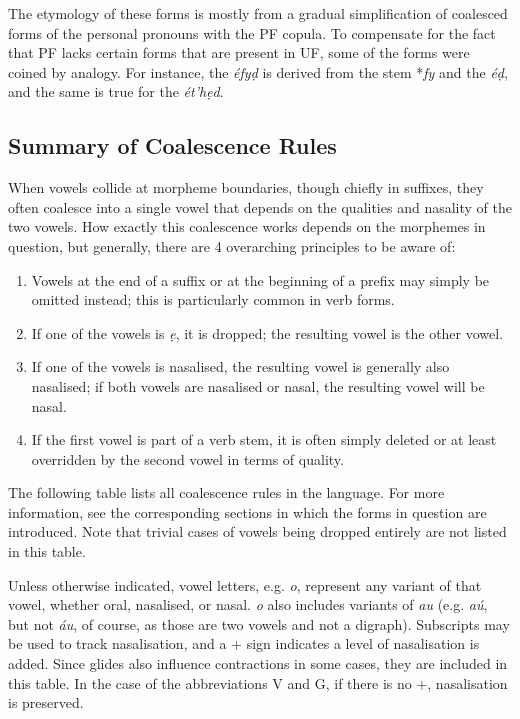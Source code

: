 \documentclass[a4paper, 12pt, twoside, final]{article}
\let \w \textit
\begin{document}
The etymology of these forms is mostly from a gradual simplification of coalesced forms of the personal
pronouns with the PF copula. To compensate for the fact that PF lacks certain forms that are present in UF, some
of the forms were coined by analogy. For instance, the  \w{éfyḍ} is derived from the 
stem *\w{fy} and the  \w{éḍ}, and the same is true for the  \w{ét’hẹd}.

\subsection{Summary of Coalescence Rules}
When vowels collide at morpheme boundaries, though chiefly in suffixes, they often coalesce into a
single vowel that depends on the qualities and nasality of the two vowels. How exactly this coalescence
works depends on the morphemes in question, but generally, there are 4 overarching principles to be
aware of:
\begin{enumerate}
\item Vowels at the end of a suffix or at the beginning of a prefix may simply be omitted instead;
      this is particularly common in verb forms.
\item If one of the vowels is \w{ẹ}, it is dropped; the resulting vowel is the other vowel.
\item If one of the vowels is nasalised, the resulting vowel is generally also nasalised; if both
      vowels are nasalised or nasal, the resulting vowel will be nasal.
\item If the first vowel is part of a verb stem, it is often simply deleted or at least overridden
      by the second vowel in terms of quality.
\end{enumerate}

\noindent The following table lists all coalescence rules in the language. For more information, see the corresponding
sections in which the forms in question are introduced. Note that trivial cases of vowels being dropped entirely
are not listed in this table.

Unless otherwise indicated, vowel letters, e.g. \w{o}, represent any variant of that vowel, whether oral, nasalised, or nasal.
\w{o} also includes variants of \w{au} (e.g. \w{aú}, but not \w{áu}, of course, as those are two vowels and not a digraph).
Subscripts may be used to track nasalisation, and a + sign indicates a level of nasalisation is added. Since glides also
influence contractions in some cases, they are included in this table. In the case of the abbreviations V and G, if there
is no +, nasalisation is preserved.
\end{document}
